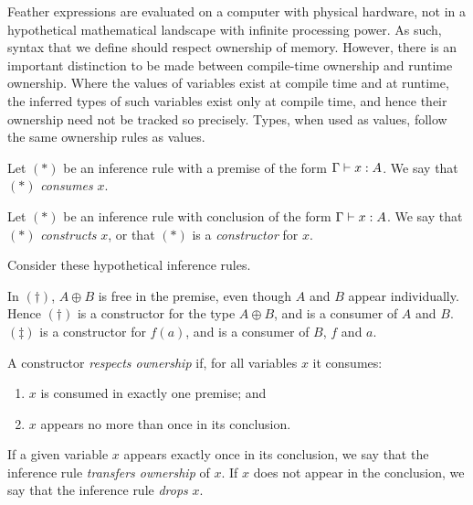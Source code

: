 \documentclass[UKenglish, 11pt, a4paper, parskip=half]{scrbook}
\begin{document}
Feather expressions are evaluated on a computer with physical hardware, not in a hypothetical mathematical landscape with infinite processing power.
As such, syntax that we define should respect ownership of memory.
However, there is an important distinction to be made between compile-time ownership and runtime ownership.
Where the values of variables exist at compile time and at runtime, the inferred types of such variables exist only at compile time, and hence their ownership need not be tracked so precisely.
Types, when used as values, follow the same ownership rules as values.
\begin{defn}
  Let \((\ast)\) be an inference rule with a premise of the form \( \Gamma \vdash x : A \).
  We say that \((\ast)\) \textit{consumes} \( x \).
\end{defn}
\begin{defn}
  Let \((\ast)\) be an inference rule with conclusion of the form \( \Gamma \vdash x : A \).
  We say that \((\ast)\) \textit{constructs} \( x \), or that \((\ast)\) is a \textit{constructor} for \( x \).
\end{defn}
\begin{eg}
  Consider these hypothetical inference rules.
  In \((\dagger)\), \( A \oplus B \) is free in the premise, even though \( A \) and \( B \) appear individually.
  Hence \((\dagger)\) is a constructor for the type \( A \oplus B \), and is a consumer of \( A \) and \( B \).
  \((\ddagger)\) is a constructor for \( f(a) \), and is a consumer of \( B \), \( f \) and \( a \).
\end{eg}
\begin{defn}
  A constructor \textit{respects ownership} if, for all variables \( x \) it consumes:
  \begin{enumerate}
    \item \( x \) is consumed in exactly one premise; and
    \item \( x \) appears no more than once in its conclusion.
  \end{enumerate}
  If a given variable \( x \) appears exactly once in its conclusion, we say that the inference rule \textit{transfers ownership} of \( x \).
  If \( x \) does not appear in the conclusion, we say that the inference rule \textit{drops} \( x \).
\end{defn}
\end{document}
